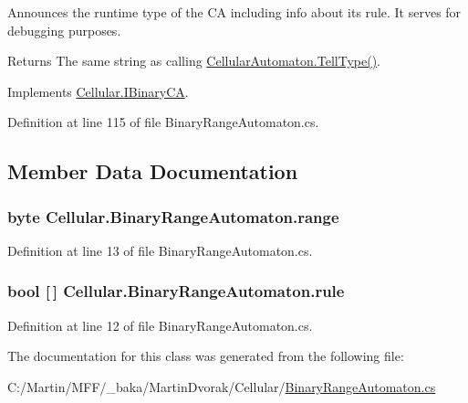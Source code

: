 Announces the runtime type of the C\+A including info about its rule. It serves for debugging purposes. 

\begin{DoxyReturn}{Returns}
The same string as calling {\ttfamily \hyperlink{class_cellular_1_1_cellular_automaton_abe4b92fd405530c8a08cc07a3a19fff4}{Cellular\+Automaton.\+Tell\+Type()}}.
\end{DoxyReturn}


Implements \hyperlink{interface_cellular_1_1_i_binary_c_a_aa67feabf5d1513aa74076d255c661948}{Cellular.\+I\+Binary\+C\+A}.



Definition at line 115 of file Binary\+Range\+Automaton.\+cs.



\subsection{Member Data Documentation}
\hypertarget{class_cellular_1_1_binary_range_automaton_a9a391c738dc7725aa66a52dca039a2f7}{}
\subsubsection[{range}]{\setlength{\rightskip}{0pt plus 5cm}byte Cellular.\+Binary\+Range\+Automaton.\+range\hspace{0.3cm}{\ttfamily [protected]}}\label{class_cellular_1_1_binary_range_automaton_a9a391c738dc7725aa66a52dca039a2f7}


Definition at line 13 of file Binary\+Range\+Automaton.\+cs.

\hypertarget{class_cellular_1_1_binary_range_automaton_a4dda99c3151599c8ef12d08d7472144c}{}
\subsubsection[{rule}]{\setlength{\rightskip}{0pt plus 5cm}bool \mbox{[}$\,$\mbox{]} Cellular.\+Binary\+Range\+Automaton.\+rule\hspace{0.3cm}{\ttfamily [protected]}}\label{class_cellular_1_1_binary_range_automaton_a4dda99c3151599c8ef12d08d7472144c}


Definition at line 12 of file Binary\+Range\+Automaton.\+cs.



The documentation for this class was generated from the following file\+:\begin{DoxyCompactItemize}
\item 
C\+:/\+Martin/\+M\+F\+F/\+\_\+baka/\+Martin\+Dvorak/\+Cellular/\hyperlink{_binary_range_automaton_8cs}{Binary\+Range\+Automaton.\+cs}\end{DoxyCompactItemize}

